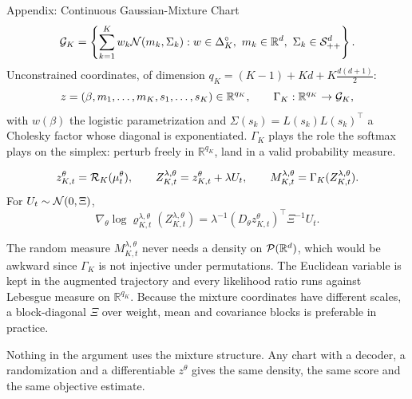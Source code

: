 \documentclass[9pt]{beamer}
\def\Pc{{\cal P}}
\def\Rc{{\cal R}}
\def\Sc{{\cal S}}
\def\Gc{{\cal G}}
\def\Nc{{\cal N}}
\def\R{{\mathbb R}}
\begin{document}
\begin{frame}{Appendix: Continuous Gaussian-Mixture Chart}
\small
\[
  \Gc_K=
  \left\{\sum_{k=1}^{K}w_k\Nc(m_k,\Sigma_k)
  : w\in\Delta_K^\circ,\ m_k\in\R^d,\ \Sigma_k\in\Sc_{++}^d\right\}.
\]
Unconstrained coordinates, of dimension $q_K=(K-1)+Kd+K\tfrac{d(d+1)}2$:
\[
  z=(\beta,m_1,\ldots,m_K,s_1,\ldots,s_K)\in\R^{q_K},
  \qquad
  \Gamma_K:\R^{q_K}\to\Gc_K,
\]
with $w(\beta)$ the logistic parametrization and $\Sigma(s_k)=L(s_k)L(s_k)^\top$ a Cholesky factor whose diagonal is exponentiated. $\Gamma_K$ plays the role the softmax plays on the simplex: perturb freely in $\R^{q_K}$, land in a valid probability measure.

\vspace{0.15cm}
\[
  z_{K,t}^\theta=\Rc_K(\mu_t^\theta),
  \qquad
  Z_{K,t}^{\lambda,\theta}=z_{K,t}^\theta+\lambda U_t,
  \qquad
  M_{K,t}^{\lambda,\theta}=\Gamma_K(Z_{K,t}^{\lambda,\theta}).
\]
For $U_t\sim\Nc(0,\Xi)$,
\[
  \nabla_\theta\log\varrho_{K,t}^{\lambda,\theta}(Z_{K,t}^{\lambda,\theta})
  =
  \lambda^{-1}(D_\theta z_{K,t}^{\theta})^\top\Xi^{-1}U_t .
\]

\vspace{0.15cm}
\scriptsize
The random measure $M_{K,t}^{\lambda,\theta}$ never needs a density on $\Pc(\R^d)$, which would be awkward since $\Gamma_K$ is not injective under permutations. The Euclidean variable is kept in the augmented trajectory and every likelihood ratio runs against Lebesgue measure on $\R^{q_K}$. Because the mixture coordinates have different scales, a block-diagonal $\Xi$ over weight, mean and covariance blocks is preferable in practice.

\vspace{0.1cm}
Nothing in the argument uses the mixture structure. Any chart with a decoder, a randomization and a differentiable $z^\theta$ gives the same density, the same score and the same objective estimate.
\end{frame}
\end{document}

